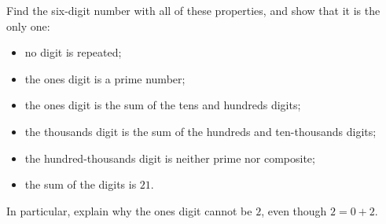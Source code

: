 Find the six-digit number with all of these properties, and show that it is the only one:
\begin{itemize}
\item no digit is repeated;
\item the ones digit is a prime number;
\item the ones digit is the sum of the tens and hundreds digits;
\item the thousands digit is the sum of the hundreds and ten-thousands digits;
\item the hundred-thousands digit is neither prime nor composite;
\item the sum of the digits is $21$.
\end{itemize}
In particular, explain why the ones digit cannot be $2$, even though $2=0+2$.
